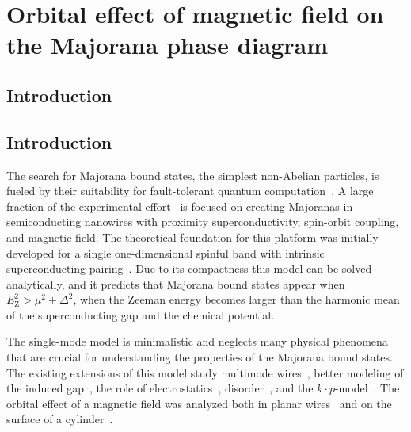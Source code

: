 \chapter{Orbital effect of magnetic field on the Majorana phase diagram}
\label{ch:orbitalfield}

\newpage
\noindent 
\section{Introduction}

\section{Introduction}
The search for Majorana bound states, the simplest non-Abelian particles, is fueled by their suitability for fault-tolerant quantum computation~\cite{Alicea2012,Beenakker2013}.
A large fraction of the experimental effort~\cite{Mourik2012,Das2012,Deng2012,Churchill2013,Deng2014} is focused on creating Majoranas in semiconducting nanowires with proximity superconductivity, spin-orbit coupling, and magnetic field.
The theoretical foundation for this platform was initially developed for a single one-dimensional spinful band with intrinsic superconducting pairing~\cite{Lutchyn2010,Oreg2010}.
Due to its compactness this model can be solved analytically, and it predicts that Majorana bound states appear when $E_\textrm{Z}^{2}>\mu^{2}+\Delta^{2}$, when the Zeeman energy becomes larger than the harmonic mean of the superconducting gap and the chemical potential.

The single-mode model is minimalistic and neglects many physical phenomena that are crucial for understanding the properties of the Majorana bound states.
The existing extensions of this model study multimode wires~\cite{Potter2010}, better modeling of the induced gap~\cite{Liu2012,Stanescu2014}, the role of electrostatics~\cite{Vuik2016}, disorder~\cite{Potter2012,Pientka2012,Adagideli2014}, and the $k \cdot p$-model~\cite{Stanescu2013}.
The orbital effect of a magnetic field was analyzed both in planar wires~\cite{Osca2015, Lim2012} and on the surface of a cylinder~\cite{Lim2013}.


